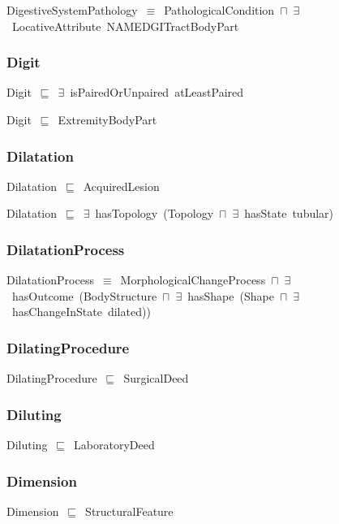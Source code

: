 \documentclass{article}
\begin{document}
DigestiveSystemPathology~\ensuremath{\equiv}~PathologicalCondition~\ensuremath{\sqcap}~\ensuremath{\exists}~LocativeAttribute~NAMEDGITractBodyPart

\subsubsection*{Digit}

Digit~\ensuremath{\sqsubseteq}~\ensuremath{\exists}~isPairedOrUnpaired~atLeastPaired~

Digit~\ensuremath{\sqsubseteq}~ExtremityBodyPart~

\subsubsection*{Dilatation}

Dilatation~\ensuremath{\sqsubseteq}~AcquiredLesion~

Dilatation~\ensuremath{\sqsubseteq}~\ensuremath{\exists}~hasTopology~(Topology~\ensuremath{\sqcap}~\ensuremath{\exists}~hasState~tubular)~

\subsubsection*{DilatationProcess}

DilatationProcess~\ensuremath{\equiv}~MorphologicalChangeProcess~\ensuremath{\sqcap}~\ensuremath{\exists}~hasOutcome~(BodyStructure~\ensuremath{\sqcap}~\ensuremath{\exists}~hasShape~(Shape~\ensuremath{\sqcap}~\ensuremath{\exists}~hasChangeInState~dilated))

\subsubsection*{DilatingProcedure}

DilatingProcedure~\ensuremath{\sqsubseteq}~SurgicalDeed~

\subsubsection*{Diluting}

Diluting~\ensuremath{\sqsubseteq}~LaboratoryDeed~

\subsubsection*{Dimension}

Dimension~\ensuremath{\sqsubseteq}~StructuralFeature~
\end{document}
